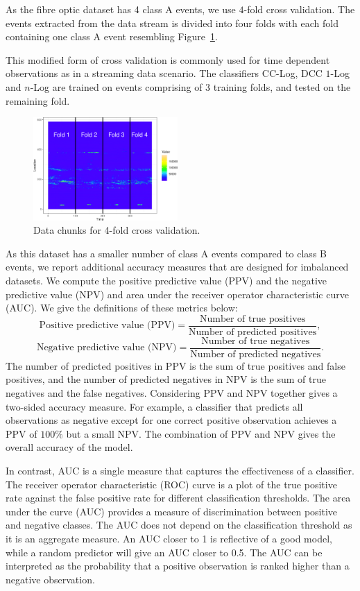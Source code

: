 \documentclass[a4paper,11pt]{article}
\newif\ifxyz
\let\ifxyz\iffalse
\begin{document}
As the fibre optic dataset has 4 class A events, we use $4$-fold cross validation. The events extracted from the data stream is  divided into four folds with each fold containing one class A event resembling Figure~\ref{fig:FourFolds}.

This modified form of cross validation is commonly used for time dependent observations \citep{watersurrogates} as in a streaming data scenario. The classifiers CC-Log, \ifxyz DCC \fi $1$-Log and $n$-Log are trained on events comprising of 3 training folds, and tested on the remaining fold.

\begin{figure}
	\centering
	\includegraphics[width=0.49\textwidth]{./Graphics/4Fold_CV.pdf}
	\caption{Data chunks for 4-fold cross validation.}
  \label{fig:FourFolds}
\end{figure}

As this dataset has a smaller number of class A events compared to class B events, we report additional accuracy measures that are designed for imbalanced datasets. We compute the positive predictive value (PPV) and the negative predictive value (NPV) and area under the receiver operator characteristic curve (AUC).
We give the definitions of these metrics below:
\[
	\text{Positive predictive value (PPV)} = \frac{\text{Number of true positives}}{\text{Number of predicted positives}}  ,
\]
\[
	\text{Negative predictive value (NPV)} = \frac{\text{Number of true negatives}}{\text{Number of predicted negatives}}  .
\]
The number of predicted positives in PPV is the sum of true positives and false positives, and the number of predicted negatives in NPV is the sum of true negatives and the false negatives. Considering PPV and NPV together gives a two-sided accuracy measure. For example, a classifier that predicts all observations as negative except for one correct positive observation achieves a PPV of $100\%$ but a small NPV\@. The combination of PPV and NPV gives the overall accuracy of the model.

In contrast, AUC is a single measure that captures the effectiveness of a classifier. The receiver operator characteristic (ROC) curve is a plot of the true positive rate against the false positive rate for different classification thresholds. The area under the curve (AUC) provides a measure of discrimination between positive and negative classes. The AUC does not depend on the classification threshold as it is an aggregate measure. An AUC closer to 1 is reflective of a good model, while a random predictor will give an AUC closer to 0.5. The AUC can be interpreted as the probability that a positive observation is ranked higher than a negative observation.
\end{document}
